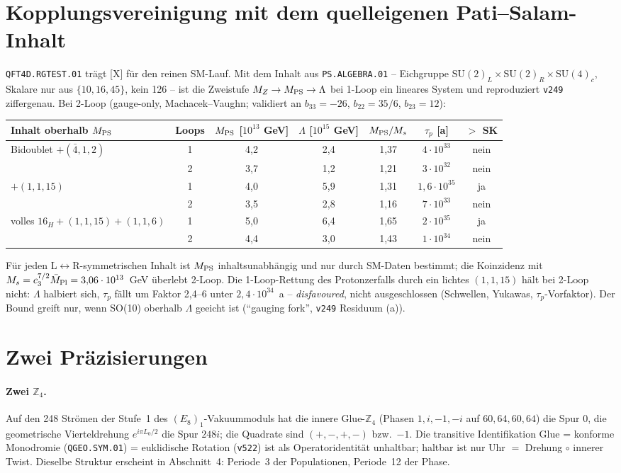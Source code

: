 \section{Kopplungsvereinigung mit dem quelleigenen Pati--Salam-Inhalt}
\texttt{QFT4D.RGTEST.01} trägt [X] für den reinen SM-Lauf. Mit dem Inhalt aus \texttt{PS.ALGEBRA.01} -- Eichgruppe $\mathrm{SU}(2)_L\times\mathrm{SU}(2)_R\times\mathrm{SU}(4)_c$, Skalare nur aus $\{10,16,45\}$, kein 126 -- ist die Zweistufe $M_Z\to M_{\rm PS}\to\Lambda$ bei 1-Loop ein lineares System und reproduziert \texttt{v249} ziffergenau. Bei 2-Loop (gauge-only, Machacek--Vaughn; validiert an $b_{33}=-26$, $b_{22}=35/6$, $b_{23}=12$):
\begin{center}\small
\begin{tabular}{@{}lcccccc@{}}\toprule
Inhalt oberhalb $M_{\rm PS}$ & Loops & $M_{\rm PS}$ [$10^{13}$ GeV] & $\Lambda$ [$10^{15}$ GeV] & $M_{\rm PS}/M_s$ & $\tau_p$ [a] & $>$ SK\\\midrule
Bidoublet $+(\bar4,1,2)$ & 1 & 4{,}2 & 2{,}4 & 1{,}37 & $4\cdot10^{33}$ & nein\\
 & 2 & 3{,}7 & 1{,}2 & 1{,}21 & $3\cdot10^{32}$ & nein\\
$+(1,1,15)$ & 1 & 4{,}0 & 5{,}9 & 1{,}31 & $1{,}6\cdot10^{35}$ & ja\\
 & 2 & 3{,}5 & 2{,}8 & 1{,}16 & $7\cdot10^{33}$ & nein\\
volles $16_H+(1,1,15)+(1,1,6)$ & 1 & 5{,}0 & 6{,}4 & 1{,}65 & $2\cdot10^{35}$ & ja\\
 & 2 & 4{,}4 & 3{,}0 & 1{,}43 & $1\cdot10^{34}$ & nein\\\bottomrule
\end{tabular}
\end{center}
Für jeden L$\leftrightarrow$R-symmetrischen Inhalt ist $M_{\rm PS}$ inhaltsunabhängig und nur durch SM-Daten bestimmt; die Koinzidenz mit $M_s=c_3^{7/2}\bar M_{\rm Pl}=3{,}06\cdot10^{13}$~GeV überlebt 2-Loop. Die 1-Loop-Rettung des Protonzerfalls durch ein lichtes $(1,1,15)$ hält bei 2-Loop nicht: $\Lambda$ halbiert sich, $\tau_p$ fällt um Faktor 2{,}4--6 unter $2{,}4\cdot10^{34}$~a -- \emph{disfavoured}, nicht ausgeschlossen (Schwellen, Yukawas, $\tau_p$-Vorfaktor). Der Bound greift nur, wenn SO(10) oberhalb $\Lambda$ geeicht ist (\enquote{gauging fork}, \texttt{v249} Residuum (a)).

\section{Zwei Präzisierungen}
\paragraph{Zwei $\mathbb Z_4$.} Auf den 248 Strömen der Stufe~1 des $(E_8)_1$-Vakuummoduls hat die innere Glue-$\mathbb Z_4$ (Phasen $1,i,-1,-i$ auf $60,64,60,64$) die Spur $0$, die geometrische Vierteldrehung $e^{i\pi L_0/2}$ die Spur $248i$; die Quadrate sind $(+,-,+,-)$ bzw.\ $-1$. Die transitive Identifikation Glue = konforme Monodromie (\texttt{QGEO.SYM.01}) = euklidische Rotation (\texttt{v522}) ist als Operatoridentität unhaltbar; haltbar ist nur Uhr $=$ Drehung $\circ$ innerer Twist. Dieselbe Struktur erscheint in Abschnitt~4: Periode~3 der Populationen, Periode~12 der Phase.
